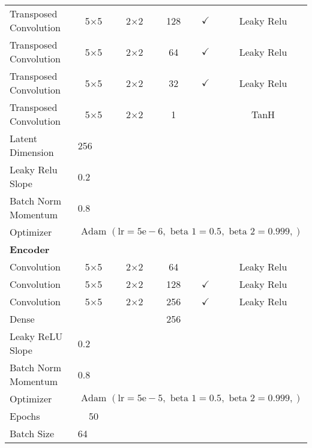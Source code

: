 \begin{longtable}[c]{@{}lccccc@{}}
	Transposed Convolution & \multicolumn{1}{c}{5$\times$5} & 2$\times$2 & 128 & $\checkmark$ & Leaky Relu \\
	Transposed Convolution & \multicolumn{1}{c}{5$\times$5} & 2$\times$2 & 64 & $\checkmark$ & Leaky Relu \\
	Transposed Convolution & \multicolumn{1}{c}{5$\times$5} & 2$\times$2 & 32 & $\checkmark$ & Leaky Relu \\
	Transposed Convolution & \multicolumn{1}{c}{5$\times$5} & 2$\times$2 & 1 &  & TanH\\
	Latent Dimension & \multicolumn{5}{l}{256} \\
	Leaky Relu Slope & \multicolumn{5}{l}{0.2} \\
	Batch Norm Momentum & \multicolumn{5}{l}{0.8} \\
	Optimizer & \multicolumn{5}{l}{$\text { Adam }(\mathrm{lr}=5 \mathrm{e}-6, \text { beta } 1=0.5, \text { beta } 2=0.999,)$} \\ \hline
	\multicolumn{6}{l}{\textbf{Encoder}} \\
	Convolution & \multicolumn{1}{c}{5$\times$5} & 2$\times$2 & 64 &  & Leaky Relu \\
	Convolution & \multicolumn{1}{c}{5$\times$5} & 2$\times$2 & 128 & $\checkmark$ & Leaky Relu \\
	Convolution & \multicolumn{1}{c}{5$\times$5} & 2$\times$2 & 256 & $\checkmark$ & Leaky Relu \\
	Dense & \multicolumn{1}{c}{} &  & 256 &  &  \\ 
	Leaky ReLU Slope & \multicolumn{5}{l}{0.2} \\
	Batch Norm Momentum & \multicolumn{5}{l}{0.8} \\
	Optimizer & \multicolumn{5}{l}{$\text { Adam }(\mathrm{lr}=5 \mathrm{e}-5, \text { beta } 1=0.5, \text { beta } 2=0.999,)$} \\ \hline
	Epochs & 50 & \multicolumn{1}{l}{} & \multicolumn{1}{l}{} & \multicolumn{1}{l}{} & \multicolumn{1}{l}{} \\
	Batch Size & \multicolumn{5}{l}{64}
		
\end{longtable}

